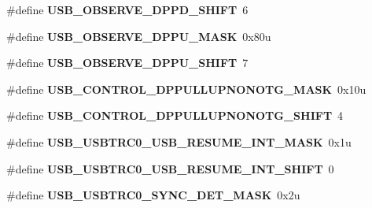 \begin{DoxyCompactItemize}
\item 
\#define {\bfseries U\+S\+B\+\_\+\+O\+B\+S\+E\+R\+V\+E\+\_\+\+D\+P\+P\+D\+\_\+\+S\+H\+I\+FT}~6\hypertarget{group__USB__Register__Masks_gaba84f8caae5d942588bd678bbc2ad267}{}\label{group__USB__Register__Masks_gaba84f8caae5d942588bd678bbc2ad267}

\item 
\#define {\bfseries U\+S\+B\+\_\+\+O\+B\+S\+E\+R\+V\+E\+\_\+\+D\+P\+P\+U\+\_\+\+M\+A\+SK}~0x80u\hypertarget{group__USB__Register__Masks_ga04f8b1d77478cb027a79323cef482965}{}\label{group__USB__Register__Masks_ga04f8b1d77478cb027a79323cef482965}

\item 
\#define {\bfseries U\+S\+B\+\_\+\+O\+B\+S\+E\+R\+V\+E\+\_\+\+D\+P\+P\+U\+\_\+\+S\+H\+I\+FT}~7\hypertarget{group__USB__Register__Masks_ga08ff5b00473fda9eb458f3457490eb15}{}\label{group__USB__Register__Masks_ga08ff5b00473fda9eb458f3457490eb15}

\item 
\#define {\bfseries U\+S\+B\+\_\+\+C\+O\+N\+T\+R\+O\+L\+\_\+\+D\+P\+P\+U\+L\+L\+U\+P\+N\+O\+N\+O\+T\+G\+\_\+\+M\+A\+SK}~0x10u\hypertarget{group__USB__Register__Masks_ga764d9d972859eeded5e092a77eb4de79}{}\label{group__USB__Register__Masks_ga764d9d972859eeded5e092a77eb4de79}

\item 
\#define {\bfseries U\+S\+B\+\_\+\+C\+O\+N\+T\+R\+O\+L\+\_\+\+D\+P\+P\+U\+L\+L\+U\+P\+N\+O\+N\+O\+T\+G\+\_\+\+S\+H\+I\+FT}~4\hypertarget{group__USB__Register__Masks_ga5bae9683a5ae7c48617b8d24a35786ce}{}\label{group__USB__Register__Masks_ga5bae9683a5ae7c48617b8d24a35786ce}

\item 
\#define {\bfseries U\+S\+B\+\_\+\+U\+S\+B\+T\+R\+C0\+\_\+\+U\+S\+B\+\_\+\+R\+E\+S\+U\+M\+E\+\_\+\+I\+N\+T\+\_\+\+M\+A\+SK}~0x1u\hypertarget{group__USB__Register__Masks_ga9c943cc95fdf52fa40311292f2801518}{}\label{group__USB__Register__Masks_ga9c943cc95fdf52fa40311292f2801518}

\item 
\#define {\bfseries U\+S\+B\+\_\+\+U\+S\+B\+T\+R\+C0\+\_\+\+U\+S\+B\+\_\+\+R\+E\+S\+U\+M\+E\+\_\+\+I\+N\+T\+\_\+\+S\+H\+I\+FT}~0\hypertarget{group__USB__Register__Masks_ga48af1176ed5d811c299eb123f934425d}{}\label{group__USB__Register__Masks_ga48af1176ed5d811c299eb123f934425d}

\item 
\#define {\bfseries U\+S\+B\+\_\+\+U\+S\+B\+T\+R\+C0\+\_\+\+S\+Y\+N\+C\+\_\+\+D\+E\+T\+\_\+\+M\+A\+SK}~0x2u\hypertarget{group__USB__Register__Masks_ga2e2f3b4bb79885ed92d75c9f86d42e23}{}\label{group__USB__Register__Masks_ga2e2f3b4bb79885ed92d75c9f86d42e23}


\end{DoxyCompactItemize}
